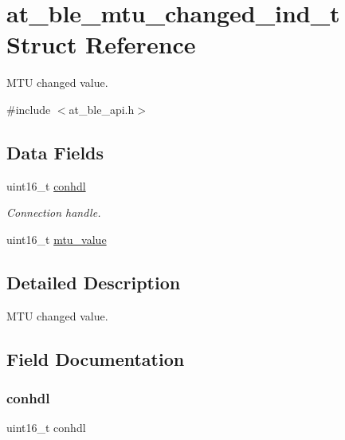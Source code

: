 \hypertarget{structat__ble__mtu__changed__ind__t}{}\section{at\+\_\+ble\+\_\+mtu\+\_\+changed\+\_\+ind\+\_\+t Struct Reference}
\label{structat__ble__mtu__changed__ind__t}


M\+TU changed value.  




{\ttfamily \#include $<$at\+\_\+ble\+\_\+api.\+h$>$}

\subsection*{Data Fields}
\begin{DoxyCompactItemize}
\item 
uint16\+\_\+t \mbox{\hyperlink{structat__ble__mtu__changed__ind__t_a0e06225279ecca6fb6e57fe77c344f27}{conhdl}}
\begin{DoxyCompactList}\small\item\em Connection handle. \end{DoxyCompactList}\item 
uint16\+\_\+t \mbox{\hyperlink{structat__ble__mtu__changed__ind__t_a1a5545fe8d67ae23337095aed768e9e8}{mtu\+\_\+value}}
\end{DoxyCompactItemize}


\subsection{Detailed Description}
M\+TU changed value. 

\subsection{Field Documentation}
\mbox{\label{structat__ble__mtu__changed__ind__t_a0e06225279ecca6fb6e57fe77c344f27}} 
\subsubsection{\texorpdfstring{conhdl}{conhdl}}
{\footnotesize\ttfamily uint16\+\_\+t conhdl}



